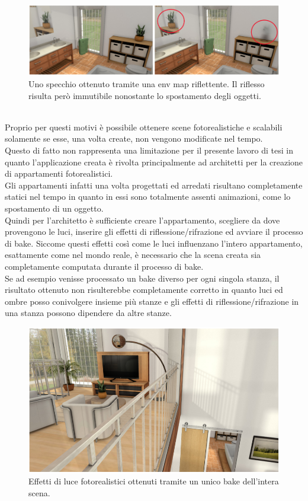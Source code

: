 \begin{figure}[htb]
 \centering
 \includegraphics[width=1\linewidth]{images/chapter_lrl/lrl_appl2.png}\hfill
 \caption[Applicabilità, riflesso con env map]{Uno specchio ottenuto tramite una env map riflettente. Il riflesso risulta però immutibile nonostante lo spostamento degli oggetti.}
 \label{fig:lrl_appl2}
\end{figure}
\\
Proprio per questi motivi è possibile ottenere scene fotorealistiche e scalabili solamente se esse, una volta create, non vengono modificate nel tempo.
\\
Questo di fatto non rappresenta una limitazione per il presente lavoro di tesi in quanto l’applicazione creata è rivolta principalmente ad architetti per la creazione di appartamenti fotorealistici.
\\
Gli appartamenti infatti una volta progettati ed arredati risultano completamente statici nel tempo in quanto in essi sono totalmente assenti animazioni, come lo spostamento di un oggetto.
\\
Quindi per l’architetto è sufficiente creare l’appartamento, scegliere da dove provengono le luci, inserire gli effetti di riflessione/rifrazione ed avviare il processo di bake.
Siccome questi effetti così come le luci influenzano l’intero appartamento, esattamente come nel mondo reale, è necessario che la scena creata sia completamente computata durante il processo di bake. 
\\
Se ad esempio venisse processato un bake diverso per ogni singola stanza, il risultato ottenuto non risulterebbe completamente corretto in quanto luci ed ombre posso conivolgere insieme più stanze e gli effetti di riflessione/rifrazione in una stanza possono dipendere da altre stanze.
\\
\begin{figure}[htb]
 \centering
 \includegraphics[width=1\linewidth]{images/chapter_lrl/lrl_appl3.png}\hfill
 \caption[Applicabilità, scene autocontenute]{Effetti di luce fotorealistici ottenuti tramite un unico bake dell'intera scena.}
 \label{fig:lrl_appl3}
\end{figure}
